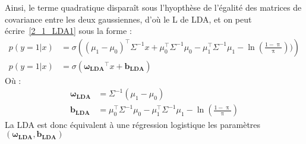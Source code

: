 \documentclass[12pt,a4paper,onecolumn]{article}
\begin{document}
Ainsi, le terme quadratique disparaît sous l'hyopthèse de l'égalité des matrices de covariance entre les deux gaussiennes, d'où le L de LDA, et on peut écrire~\eqref{2_1_LDA1} sous la forme :
\begin{equation}
	\begin{split}
		p(y = 1 | x) &= \sigma\left((\mu_1 - \mu_0)^\intercal\Sigma^{-1}x + \mu_0^\intercal\Sigma^{-1}\mu_0 - \mu_1^\intercal\Sigma^{-1}\mu_1 - \ln(\frac{1 - \uppi}{\uppi}))\right) \\
		p(y = 1 | x) &= \sigma\left(\bm{\omega_{LDA}}^\intercal x + \bm{b_{LDA}}\right)
	\end{split}
\end{equation}
Où :
\begin{equation}
	\begin{split}
		\bm{\omega_{LDA}} & = \Sigma^{-1} (\mu_1 - \mu_0)\\
		\bm{b_{LDA}} &= \mu_0^\intercal\Sigma^{-1}\mu_0 - \mu_1^\intercal\Sigma^{-1}\mu_1 - \ln(\frac{1 - \uppi}{\uppi})
	\end{split}
\end{equation}
La LDA est donc équivalent à une régression logistique les paramètres \((\bm{\omega_{LDA}}, \bm{b_{LDA}}) \)
\end{document}

